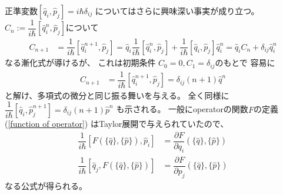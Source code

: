正準変数$[\hat{q}_i, \hat{p}_j] = i\hbar\delta_{ij}$
についてはさらに興味深い事実が成り立つ。
$C_n := \dfrac{1}{i\hbar} [\hat{q}^n_i, \hat{p}_j]$について
\begin{align}
    C_{n+1}
    &=
    \dfrac{1}{i\hbar}
    [\hat{q}^{n+1}_i, \hat{p}_j]
    =
    \hat{q}_i 
    \dfrac{1}{i\hbar}
    [\hat{q}_i^n, \hat{p}_j]
    +
    \dfrac{1}{i\hbar}
    [\hat{q}_i, \hat{p}_j] \hat{q}_i^n
    =
    \hat{q}_i C_n
    +
    \delta_{ij} \hat{q}_i^n
\end{align}
なる漸化式が導けるが、
これは初期条件
$C_0  = 0, C_1 = \delta_{ij}$のもとで
容易に
\begin{align}
    C_{n+1} &= 
    \dfrac{1}{i\hbar}
    [\hat{q}^{n+1}_i, \hat{p}_j]
    = \delta_{ij} (n+1) \hat{q}^n
\label{differential by commutator}
\end{align}
と解け、多項式の微分と同じ振る舞いを与える。
全く同様に
$\dfrac{1}{i\hbar}
[\hat{q}_i, \hat{p}^{n+1}_j]
= \delta_{ij} (n+1) \hat{p}^n$
も示される。
一般にoperatorの関数$F$の定義
(\ref{function of operator})
はTaylor展開で与えられていたので、
\begin{subequations}
\begin{align}
    \dfrac{1}{i\hbar}
    [F(\{ \hat{q} \},\{ \hat{p} \}), \hat{p}_i]
    &=
    \dfrac{ \partial F }{ \partial q_i }
    (\{ \hat{q} \},\{ \hat{p} \})
\label{commutator of function with momentum}
\\
    \dfrac{1}{i\hbar}
    [\hat{q}_j, F(\{ \hat{q} \},\{ \hat{p} \})]
    &=
    \dfrac{ \partial F }{ \partial p_j }
    (\{ \hat{q} \},\{ \hat{p} \})
\label{commutator of function with position}
\end{align}
\end{subequations}
なる公式が得られる。

